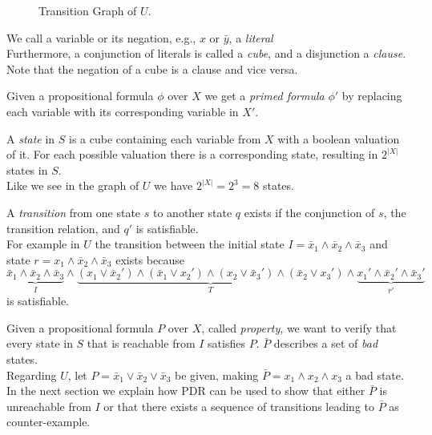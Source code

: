 \documentclass[11pt, a4paper, BCOR=10mm, ngerman]{scrbook}
\begin{document}
\begin{figure}[H]
	\centering
	
	\caption{Transition Graph of $U$.}
	\label{ex1}
\end{figure}

We call a variable or its negation, e.g., $x \text{ or } \bar y$, a \textsl{literal} \\
Furthermore, a conjunction of literals is called a \textsl{cube}, and a disjunction a \textsl{clause}. \\
Note that the negation of a cube is a clause and vice versa. \par

Given a propositional formula $\phi$ over $X$ we get a \textsl{primed formula} $\phi'$ by replacing each variable with its corresponding variable in $X'$. \par

A \textsl{state} in $S$ is a cube containing each variable from $X$ with a boolean valuation of it. For each possible valuation there is a corresponding state, resulting in $2^{|X|}$ states in $S$. \\
Like we see in the graph of $U$ we have $2^{|X|} = 2^3 = 8$ states.

A \textsl{transition} from one state $s$ to another state $q$ exists if the conjunction of $s$, the transition relation, and $q'$ is satisfiable.\\ For example in $U$ the transition between the initial state $I = \bar x_1 \land \bar x_2 \land \bar x_3$ and state $r = x_1 \land \bar x_2 \land \bar x_3$ exists because
\begin{equation*}
\underbrace{\bar x_1 \land \bar x_2 \land \bar x_3}_{I} \land \underbrace{(x_1 \lor \bar x_2' ) \land ( \bar x_1 \lor x_2') \land (x_2 \lor \bar x_3') \land ( \bar x_2 \lor x_3')}_T \land \underbrace{x_1' \land \bar x_2' \land \bar x_3'}_{r'}
\end{equation*}
is satisfiable.\par

Given a propositional formula $P$ over $X$, called \textsl{property}, we want
to verify that every state in $S$ that is reachable from
$I$ satisfies $P$. $\bar{P}$ describes a set of \textsl{bad} states.  \\ 
Regarding $U$, let $P = \bar x_1 \lor \bar x_2 \lor \bar x_3$ be given, making $\bar P = x_1 \land x_2 \land x_3$ a bad state. \\ 
In the next section we explain how PDR can be used to show that either $\bar P$ is unreachable from $I$ or that there exists a sequence of transitions leading to $\bar P$ as counter-example.
\end{document}
